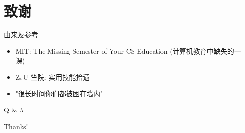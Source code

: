\documentclass{beamer}
\begin{document}
\section{致谢}

\begin{frame}{由来及参考}
    \begin{itemize}
        \item MIT: The Missing Semester of Your CS Education (计算机教育中缺失的一课)
        \item ZJU-竺院: 实用技能拾遗
        \item "很长时间你们都被困在墙内" %
    \end{itemize}
\end{frame}

\begin{frame}{Q \& A}
    \begin{center}
        {\Huge\calligra Thanks!}
    \end{center}
\end{frame}
\end{document}
